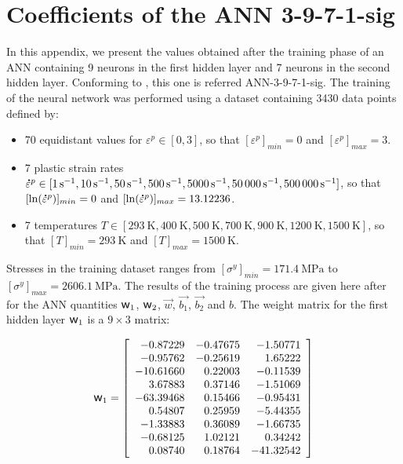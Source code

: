 \documentclass[preprint,12pt,times]{elsarticle}
\newcommand{\w}{\mbox{\large\ensuremath{\mathsf{w}}}}
\newcommand{\mdot}[1]{\accentset{\mbox{\bfseries .}}{#1}} %
\begin{document}
%
%
%


\appendix
%
\section{Coefficients of the ANN 3-9-7-1-sig\label{sec:appendix-1}}

In this appendix, we present the values obtained after the training phase of an ANN containing 9 neurons in the first hidden layer and 7 neurons in the second hidden layer. Conforming to \cite{pantale_Efficient_2022}, this one is referred ANN-3-9-7-1-sig.
The training of the neural network was performed using a dataset containing \num{3430} data points defined by:
\begin{itemize}
\item \num{70} equidistant values for $\varepsilon^p\in[0,3]$, so that $[\varepsilon^p]_{min}=0$ and $[\varepsilon^p]_{max}=3$.
\item \num{7} plastic strain rates $\mdot{\varepsilon}^p\in[\qty{1}{\per\s}, \qty{10}{\per\s}, \qty{50}{\per\s}, \qty{500}{\per\s}, \qty{5000}{\per\s}, \qty{50000}{\per\s}, \qty{500000}{\per\s}]$, so that $[\ln(\mdot{\varepsilon}^p)]_{min}=0$ and $[\ln(\mdot{\varepsilon}^p)]_{max}=13.12236$.
\item \num{7} temperatures $T\in[\qty{293}{\K}, \qty{400}{\K}, \qty{500}{\K}, \qty{700}{\K}, \qty{900}{\K}, \qty{1200}{\K}, \qty{1500}{\K}]$, so that $[T]_{min}=\qty{293}{\K}$ and $[T]_{max}=\qty{1500}{\K}$.
\end{itemize}

Stresses in the training dataset ranges from $[\sigma^y]_{min}=\qty{171.4}{\MPa}$ to $[\sigma^y]_{max}=\qty{2606.1}{\MPa}$.
The results of the training process are given here after for the ANN quantities $\w_1$, $\w_2$, $\overrightarrow{w}$, $\overrightarrow{b_1}$, $\overrightarrow{b_2}$ and $b$. The weight matrix for the first hidden layer $\w_1$ is a $9\times3$ matrix:

\begin{equation*}
\w_1=\left[
\begin{array}{rrr}
 -0.87229 & -0.47675 & -1.50771\\
 -0.95762 & -0.25619 &  1.65222\\
 -10.61660 &  0.22003 & -0.11539\\
  3.67883 &  0.37146 & -1.51069\\
 -63.39468 &  0.15466 & -0.95431\\
  0.54807 &  0.25959 & -5.44355\\
 -1.33883 &  0.36089 & -1.66735\\
 -0.68125 &  1.02121 &  0.34242\\
  0.08740 &  0.18764 & -41.32542
\end{array}\right]
\end{equation*}
\end{document}
